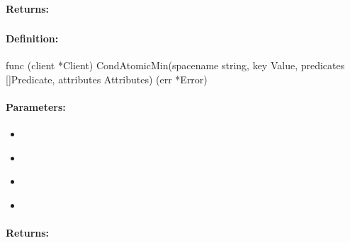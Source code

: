 \paragraph{Returns:}


\pagebreak
\subsubsection{}
\label{api:Go:CondAtomicMin}


\paragraph{Definition:}
\begin{gocode}
func (client *Client) CondAtomicMin(spacename string, key Value, predicates []Predicate, attributes Attributes) (err *Error)
\end{gocode}

\paragraph{Parameters:}
\begin{itemize}[noitemsep]
\item {}\\

\item {}\\

\item {}\\

\item {}\\

\end{itemize}

\paragraph{Returns:}


\pagebreak
\subsubsection{}
\label{api:Go:GroupAtomicMin}


